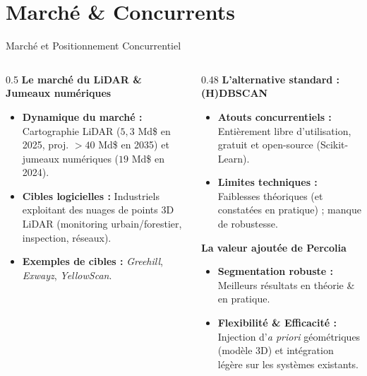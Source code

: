 \documentclass[A4,svgnames,9pt,aspectratio=169]{beamer}
\begin{document}
\section{Marché \& Concurrents}
\begin{frame}{Marché et Positionnement Concurrentiel}
    \begin{columns}[T]
        \begin{column}{0.5\textwidth}
            \textbf{\bleu Le marché du LiDAR \& Jumeaux numériques}
            \begin{itemize}
                \item \textbf{Dynamique du marché :} Cartographie LiDAR ($5,3$ Md\$ en 2025, proj. $>40$ Md\$ en 2035) et jumeaux numériques ($19$ Md\$ en 2024).
                \item \textbf{Cibles logicielles :} Industriels exploitant des nuages de points 3D LiDAR (monitoring urbain/forestier, inspection, réseaux).
                \item \textbf{Exemples de cibles :} \emph{Greehill}, \emph{Exwayz}, \emph{YellowScan}.
            \end{itemize}
        \end{column}
        
        \begin{column}{0.48\textwidth}
            \textbf{\bleu L'alternative standard : (H)DBSCAN}
            \begin{itemize}
                \item \textbf{Atouts concurrentiels :} Entièrement libre d'utilisation, gratuit et open-source (Scikit-Learn).
                \item \textbf{Limites techniques :} Faiblesses théoriques (et constatées en pratique) ; manque de robustesse.
            \end{itemize}
            
            \vspace{0.15cm}
            \textbf{\bleu La valeur ajoutée de Percolia}
            \begin{itemize}
                \item \textbf{Segmentation robuste :} Meilleurs résultats en théorie \& en pratique.
                \item \textbf{Flexibilité \& Efficacité :} Injection d'\emph{a priori} géométriques (modèle 3D) et intégration légère sur les systèmes existants.
            \end{itemize}
        \end{column}
    \end{columns}
\end{frame}
\end{document}
